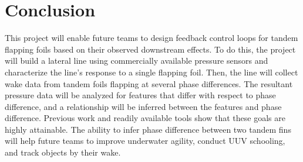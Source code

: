 \section{Conclusion}

    This project will enable future teams to design feedback control loops for tandem flapping foils based on their observed downstream effects. To do this, the project will build a lateral line using commercially available pressure sensors and characterize the line's response to a single flapping foil. Then, the line will collect wake data from tandem foils flapping at several phase differences. The resultant pressure data will be analyzed for features that differ with respect to phase difference, and a relationship will be inferred between the features and phase difference. Previous work and readily available tools show that these goals are highly attainable. The ability to infer phase difference between two tandem fins will help future teams to improve underwater agility, conduct UUV schooling, and track objects by their wake.
    
    